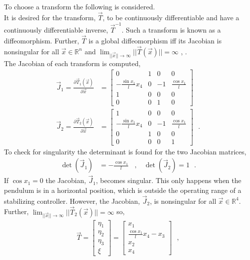 %
To choose a transform the following is considered.\\
It is desired for the transform, $\vec{T}$, to be continuously differentiable and have a continuously differentiable inverse, $\vec{T}^{-1}$. Such a transform is known as a diffeomorphism. Further, $\vec{T}$ is a global diffeomorphism iff its Jacobian is nonsingular for all $\vec{x} \in \mathbb{R}^n$ and $\lim_{||\vec{x}||\rightarrow \infty}||\vec{T}(\vec{x})|| = \infty$ , \cite{HKKhalil}.\\
The Jacobian of each transform is computed,
\begin{align}
  \vec{J}_1 = \frac{\partial \vec{T}_1(\vec{x})}{\partial \vec{x}}
  &=
  \begin{bmatrix}
    0                       & 1 &  0 & 0                  \\
    -\frac{\sin x_1}{l} x_4 & 0 & -1 & \frac{\cos x_1}{l} \\
    1                       & 0 &  0 & 0                  \\
    0                       & 0 &  1 & 0
  \end{bmatrix}  \label{eq:transform_h_x1} \\
  \vec{J}_2 = \frac{\partial \vec{T}_2(\vec{x})}{\partial \vec{x}}
  &=
  \begin{bmatrix}
    1                       & 0 &  0 & 0                  \\
    -\frac{\sin x_1}{l} x_4 & 0 & -1 & \frac{\cos x_1}{l} \\
    0                       & 1 &  0 & 0                  \\
    0                       & 0 &  0 & 1
  \end{bmatrix} \ \ \ . \label{eq:transform_h_x2}
\end{align}
To check for singularity the determinant is found for the two Jacobian matrices,
\begin{align}
  \det(\vec{J}_1) &= -\frac{\cos x_1}{l} \ \ \ \ , \ \ \ \  \det(\vec{J}_2) = 1 \ \ \ . \label{eq:determinantOfJ1andJ2}
\end{align}
If $\cos x_1 = 0$ the Jacobian, $\vec{J}_1$, becomes singular. This only happens when the pendulum is in a horizontal position, which is outside the operating range of a stabilizing controller. However, the Jacobian, $\vec{J}_2$, is nonsingular for all $\vec{x} \in \mathbb{R}^4$. Further, $\lim_{||\vec{x}||\rightarrow \infty}||\vec{T}_2(\vec{x})|| = \infty$ so,
\begin{align}
  \vec{T}
  = 
  \begin{bmatrix}
    \eta_1   \\
    \eta_2   \\
    \eta_3   \\
    \xi
  \end{bmatrix}
  =
  \begin{bmatrix}
    x_1   \\
    \frac{\cos x_1}{l} x_4 - x_3  \\
    x_2   \\
    x_4
  \end{bmatrix} \ \ \ , \label{eq:transform}
\end{align}
